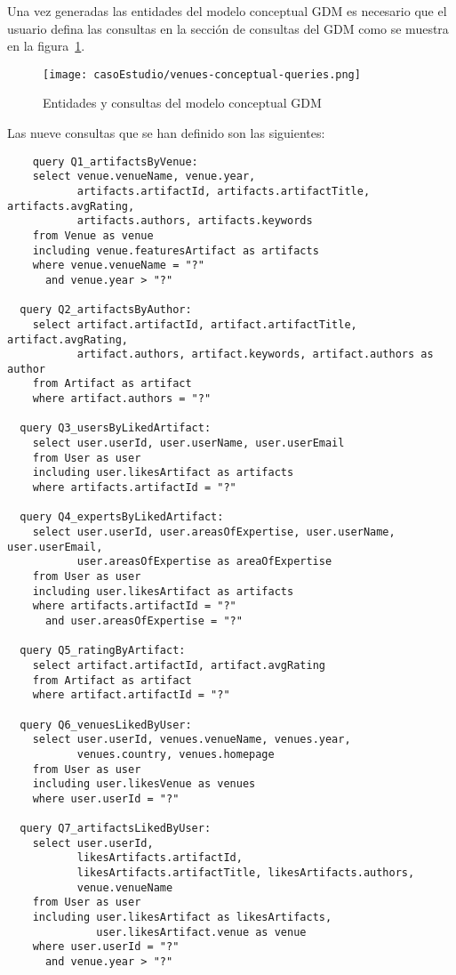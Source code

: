 Una vez generadas las entidades del modelo conceptual GDM es necesario que el usuario defina las consultas en la sección de consultas del GDM como se muestra en la figura~\ref{img:venues-conceptual-queries}.

\begin{figure}[H]
    \centering
    \texttt{[image: casoEstudio/venues-conceptual-queries.png]}
    \caption{Entidades y consultas del modelo conceptual GDM}
    \label{img:venues-conceptual-queries}
\end{figure}

Las nueve consultas que se han definido son las siguientes:

\begin{verbatim}
    query Q1_artifactsByVenue:
    select venue.venueName, venue.year,
           artifacts.artifactId, artifacts.artifactTitle, artifacts.avgRating,
           artifacts.authors, artifacts.keywords
    from Venue as venue
    including venue.featuresArtifact as artifacts
    where venue.venueName = "?"
      and venue.year > "?"
  
  query Q2_artifactsByAuthor:
    select artifact.artifactId, artifact.artifactTitle, artifact.avgRating,
           artifact.authors, artifact.keywords, artifact.authors as author
    from Artifact as artifact
    where artifact.authors = "?"
  
  query Q3_usersByLikedArtifact:
    select user.userId, user.userName, user.userEmail
    from User as user
    including user.likesArtifact as artifacts
    where artifacts.artifactId = "?"
  
  query Q4_expertsByLikedArtifact:
    select user.userId, user.areasOfExpertise, user.userName, user.userEmail,
           user.areasOfExpertise as areaOfExpertise
    from User as user
    including user.likesArtifact as artifacts
    where artifacts.artifactId = "?"
      and user.areasOfExpertise = "?"
  
  query Q5_ratingByArtifact:
    select artifact.artifactId, artifact.avgRating
    from Artifact as artifact
    where artifact.artifactId = "?"
  
  query Q6_venuesLikedByUser:
    select user.userId, venues.venueName, venues.year,
           venues.country, venues.homepage
    from User as user
    including user.likesVenue as venues
    where user.userId = "?"
  
  query Q7_artifactsLikedByUser:
    select user.userId,
           likesArtifacts.artifactId,
           likesArtifacts.artifactTitle, likesArtifacts.authors,
           venue.venueName
    from User as user
    including user.likesArtifact as likesArtifacts,
              user.likesArtifact.venue as venue
    where user.userId = "?"
      and venue.year > "?"
  

\end{verbatim}
